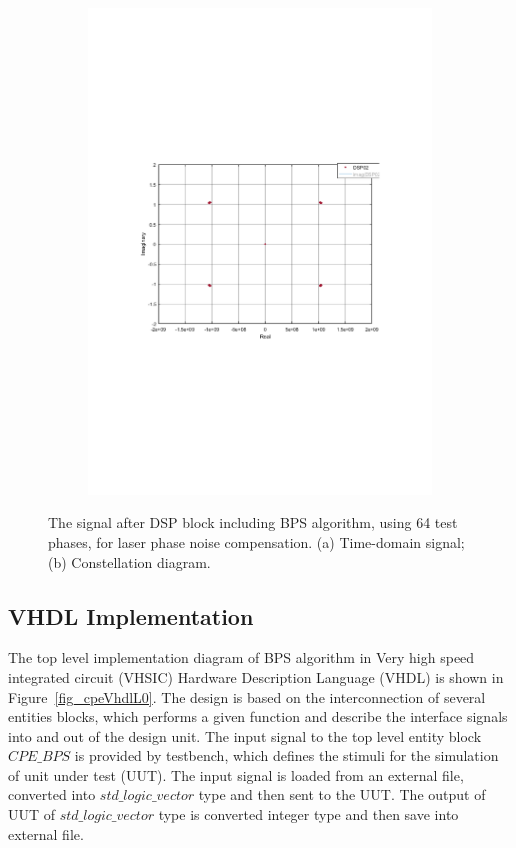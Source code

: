 \begin{refsection}
\begin{figure}[h!]
\begin{subfigure}{.5\textwidth}
  \includegraphics[width=\linewidth]{./sdf/dsp_laser_phase_compensation/figures/S24_constl_bps.pdf}
  \caption{}
  \label{fig:sub2}
\end{subfigure}
\caption{The signal after DSP block including BPS algorithm, using 64 test phases, for laser phase noise compensation. (a) Time-domain signal; (b)  Constellation diagram.}
\label{fig_s24_bps}
\end{figure}

\subsection{VHDL Implementation}

The top level implementation diagram of BPS algorithm in Very high speed integrated circuit (VHSIC) Hardware Description Language (VHDL) is shown in Figure~\ref{fig_cpeVhdlL0}. The design is based on the interconnection of several entities blocks, which performs a given function and describe the interface signals into and out of the design unit.
The input signal to the top level entity block $\textit{CPE\_BPS}$ is provided by testbench, which defines the stimuli for the simulation of unit under test (UUT). The input signal is loaded from an external file, converted into $\textit{std\_logic\_vector}$ type and then sent to the UUT. The output of UUT of $\textit{std\_logic\_vector}$ type is converted integer type and then save into external file.



\end{refsection}
